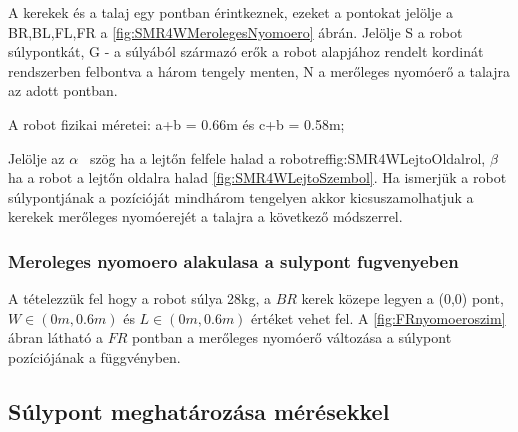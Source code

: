 A kerekek és a talaj egy pontban érintkeznek, ezeket a pontokat jelölje a BR,BL,FL,FR a \ref{fig:SMR4WMerolegesNyomoero} ábrán. Jelölje S a robot súlypontkát, G - a súlyából származó erők a robot alapjához rendelt kordinát rendszerben felbontva a három tengely menten, N a merőleges nyomóerő a talajra az adott pontban.

A robot fizikai méretei: a+b = 0.66m és c+b = 0.58m;

\renewcommand{\img}{SajatRobot/SzerkAbrak/MerolegesNyomoEro.jpg}
\renewcommand{\sources}{*}
\renewcommand{\captionn}{Merőleges nyomóerő a talajra $4W-SSMR$ típusú robot esetében.}
\renewcommand{\figlabel}{SMR4WMerolegesNyomoero}


Jelölje az $\alpha$ \ szög ha a lejtőn felfele halad a robotref{fig:SMR4WLejtoOldalrol}, $\beta$  ha a robot a lejtőn oldalra halad \ref{fig:SMR4WLejtoSzembol}. 
Ha ismerjük a robot súlypontjának a pozícióját mindhárom tengelyen akkor kicsuszamolhatjuk a kerekek merőleges nyomóerejét a talajra a következő módszerrel.



\renewcommand{\img}{SajatRobot/SzerkAbrak/LejtoOldalrol.jpg}
\renewcommand{\sources}{*}
\renewcommand{\captionn}{$4W-SSMR$ típusú robot lejtőn felfele oldal nézetből.}
\renewcommand{\aspectratioPic}{0.8}
\renewcommand{\figlabel}{SMR4WLejtoOldalrol}


\renewcommand{\img}{SajatRobot/SzerkAbrak/LejtoSzembol.png}
\renewcommand{\sources}{*}
\renewcommand{\captionn}{$4W-SSMR$ típusú robot lejtőn első nézetből.}
\renewcommand{\aspectratioPic}{0.8}
\renewcommand{\figlabel}{SMR4WLejtoSzembol}




\subsubsection{Meroleges nyomoero alakulasa a sulypont fugvenyeben}

A tételezzük fel hogy a robot súlya 28kg, a $BR$ kerek közepe legyen a (0,0) pont, $W\in(0m,0.6m)$ és $L\in(0m,0.6m)$ értéket vehet fel.
A \ref{fig:FRnyomoeroszim} ábran látható a $FR$ pontban a merőleges nyomóerő változása a súlypont pozíciójának a függvényben.




\subsection{Súlypont meghatározása mérésekkel}

